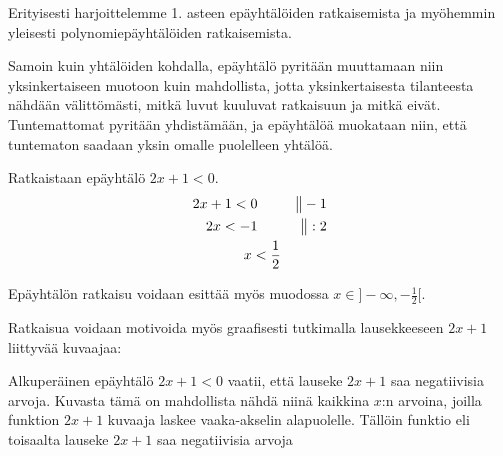 Erityisesti harjoittelemme 1. asteen epäyhtälöiden ratkaisemista ja myöhemmin yleisesti polynomiepäyhtälöiden ratkaisemista.

Samoin kuin yhtälöiden kohdalla, epäyhtälö pyritään muuttamaan niin yksinkertaiseen muotoon kuin mahdollista, jotta yksinkertaisesta tilanteesta nähdään välittömästi, mitkä luvut kuuluvat ratkaisuun ja mitkä eivät. Tuntemattomat pyritään yhdistämään, ja epäyhtälöä muokataan niin, että tuntematon saadaan yksin omalle puolelleen yhtälöä.


\begin{esimerkki}
Ratkaistaan epäyhtälö $2x+1<0$.
\begin{align*}
2x+1<0 \ \ \ \ \ &&\big\| -1 \\
2x<-1 \ \ \ \ \ &&\big\| :2 \\
x<\-\frac{1}{2}
\end{align*}

Epäyhtälön ratkaisu voidaan esittää myös muodossa $x \in ]-\infty, -\frac{1}{2}[$.

Ratkaisua voidaan motivoida myös graafisesti tutkimalla lausekkeeseen $2x+1$ liittyvää kuvaajaa:

\begin{kuvaajapohja}{1}{-2}{2}{-2}{2}
\end{kuvaajapohja}

Alkuperäinen epäyhtälö $2x+1<0$ vaatii, että lauseke $2x+1$ saa negatiivisia arvoja. Kuvasta tämä on mahdollista nähdä niinä kaikkina $x$:n arvoina, joilla funktion $2x+1$ kuvaaja laskee vaaka-akselin alapuolelle. Tällöin funktio eli toisaalta lauseke $2x+1$ saa negatiivisia arvoja

\end{esimerkki}

